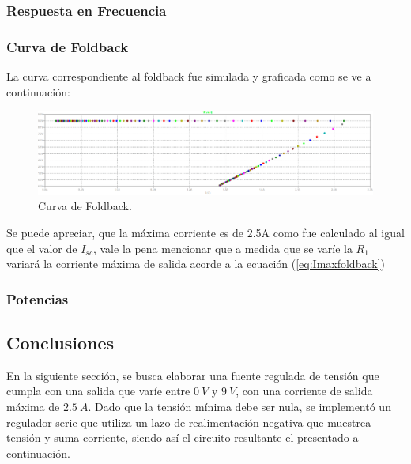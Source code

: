 \subsubsection{Respuesta en Frecuencia}
\subsubsection{Curva de Foldback}
La curva correspondiente al foldback fue simulada y graficada como se ve a continuación:
\begin{figure}[H]
\centering
	\includegraphics[width=1\textwidth]{ImagenesEjercicio2/curvefoldback.png}
	\caption{Curva de Foldback.}
	\label{fig:GraficoFOldbacki}
\end{figure}
Se puede apreciar, que la máxima corriente es de 2.5A como fue calculado al igual que el valor de $I_{sc}$, vale la pena mencionar que a medida que se varíe la $R_1$ variará la corriente máxima de salida acorde a la ecuación (\ref{eq:Imaxfoldback})
\subsubsection{Potencias}
\subsection{Conclusiones}











En la siguiente sección, se busca elaborar una fuente regulada de tensión que cumpla con una salida que varíe entre $0 \ V$ y $9 \ V$, con una corriente de salida máxima de $2.5 \ A$. Dado que la tensión mínima debe ser nula, se implementó un regulador serie que utiliza un lazo de realimentación negativa que muestrea tensión y suma corriente, siendo así el circuito resultante el presentado a continuación.
%

